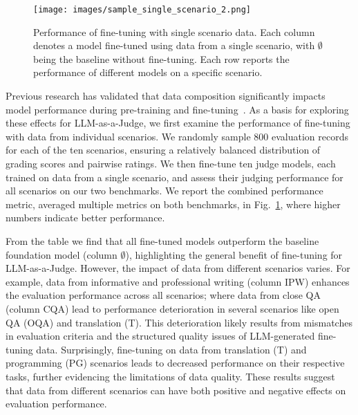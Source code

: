 \begin{figure}[t]
    \centering
    \texttt{[image: images/sample\_single\_scenario\_2.png]}
    \caption{Performance of fine-tuning with single scenario data. Each column denotes a model fine-tuned using data from a single scenario, with $\emptyset$ being the baseline without fine-tuning. Each row reports the performance of different models on a specific scenario.} %
    \label{fig:sample_single_scenario}
\end{figure}

\vspace{1ex}
Previous research has validated that data composition significantly impacts model performance during pre-training and fine-tuning~\cite{ye2024datamixinglawsoptimizing,dong2024abilitieslargelanguagemodels}. 
As a basis for exploring these effects for LLM-as-a-Judge, we first examine the performance of fine-tuning with data from individual scenarios. 
We randomly sample 800 evaluation records for each of the ten scenarios, ensuring a relatively balanced distribution of grading scores and pairwise ratings. We then fine-tune ten judge models, each trained on data from a single scenario, and assess their judging performance for all scenarios on our two benchmarks. We report the combined performance metric, \ie averaged multiple metrics on both benchmarks, in Fig.~\ref{fig:sample_single_scenario}, where higher numbers indicate better performance. 


From the table we find that all fine-tuned models outperform the baseline foundation model (column $\emptyset$), highlighting the general benefit of fine-tuning for LLM-as-a-Judge.
However, the impact of data from different scenarios varies. For example, data from informative and professional writing (column IPW) enhances the evaluation performance across all scenarios; where data from close QA (column CQA) lead to  performance deterioration in several scenarios like open QA (OQA) and translation (T). This deterioration likely results from mismatches in evaluation criteria and the structured quality issues of LLM-generated fine-tuning data.
Surprisingly, fine-tuning on data from translation (T) and programming (PG) scenarios leads to decreased performance on their respective tasks, further evidencing the limitations of data quality.
These results suggest that data from different scenarios can have both positive and negative effects on evaluation performance.


